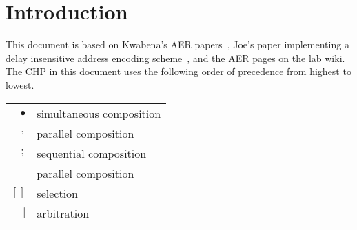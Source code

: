 \documentclass[aer.tex]{subfiles}
\begin{document}
\section{Introduction}

This document is based on Kwabena's AER papers~\cite{AER_I_Transmitter,AER_II_Receiver,AER_III_Analysis}, 
Joe's paper implementing a delay insensitive address encoding scheme~\cite{DI_AER},
and the AER pages on the lab wiki. 
The CHP in this document uses the following order of precedence from highest to lowest.

\begin{center}
  \begin{tabular}[]{rl}
    $\bullet$ & simultaneous composition \\
    $,$ & parallel composition \\
    $;$ & sequential composition \\
    $\|$ & parallel composition \\
    $[\!]$ & selection \\ 
    $\mathtt{\vert}$ & arbitration \\
  \end{tabular}
\end{center}

% 
% 
\end{document}
